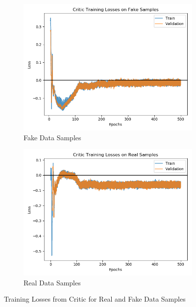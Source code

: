 \begin{figure}[h!]
    \centering
    \begin{subfigure}[b]{0.49\textwidth}
        \includegraphics[width=\textwidth]{figures/gan/critic_fake_train_losses.png}
        \caption{Fake Data Samples}\label{fig:gan_critic_fake}
    \end{subfigure}
    \begin{subfigure}[b]{0.49\textwidth}
        \includegraphics[width=\textwidth]{figures/gan/critic_real_train_losses.png}
        \caption{Real Data Samples}\label{fig:gan_critic_real}
    \end{subfigure}
    \caption{Training Losses from Critic for Real and Fake Data Samples}\label{fig:gan_real_fake_train_losses}
\end{figure}


